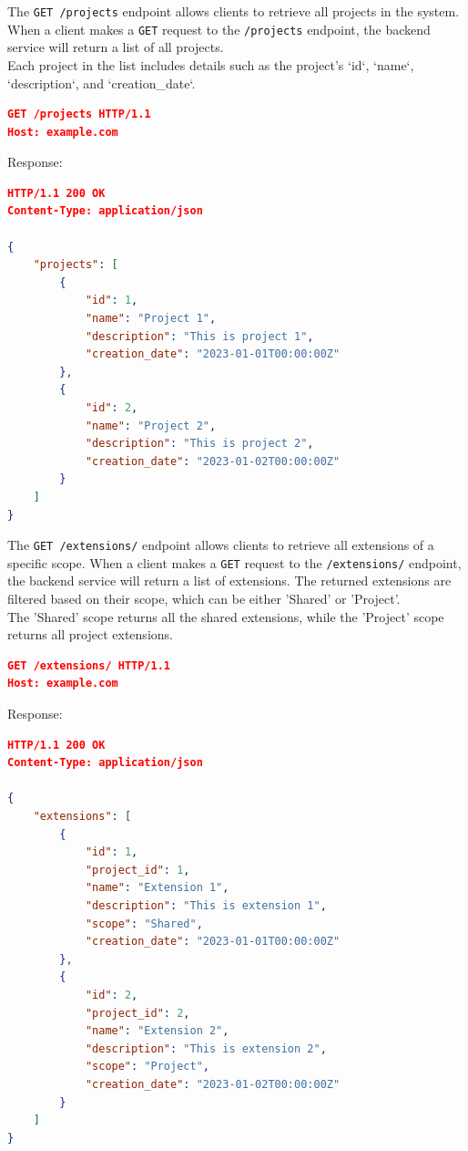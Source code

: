
The \texttt{GET /projects} endpoint allows clients to retrieve all projects in the system.
When a client makes a \texttt{GET} request to the \texttt{/projects} endpoint, the backend service will return a list of all projects.
\\Each project in the list includes details such as the project's `id`, `name`, `description`, and `creation\_date`.

\begin{lstlisting}[language=json,label={lst:lstlisting11}]
GET /projects HTTP/1.1
Host: example.com
\end{lstlisting}

Response:

\begin{lstlisting}[language=json,label={lst:lstlisting12}]
HTTP/1.1 200 OK
Content-Type: application/json

{
    "projects": [
        {
            "id": 1,
            "name": "Project 1",
            "description": "This is project 1",
            "creation_date": "2023-01-01T00:00:00Z"
        },
        {
            "id": 2,
            "name": "Project 2",
            "description": "This is project 2",
            "creation_date": "2023-01-02T00:00:00Z"
        }
    ]
}
\end{lstlisting}


The \texttt{GET /extensions/} endpoint allows clients to retrieve all extensions of a specific scope.
When a client makes a \texttt{GET} request to the \texttt{/extensions/} endpoint, the backend service will return a list of extensions.
The returned extensions are filtered based on their scope, which can be either 'Shared' or 'Project'.
\\The 'Shared' scope returns all the shared extensions, while the 'Project' scope returns all project extensions.
\\
\begin{lstlisting}[language=json,label={lst:lstlisting13}]
GET /extensions/ HTTP/1.1
Host: example.com
\end{lstlisting}

Response:

\begin{lstlisting}[language=json,label={lst:lstlisting14}]
HTTP/1.1 200 OK
Content-Type: application/json

{
    "extensions": [
        {
            "id": 1,
            "project_id": 1,
            "name": "Extension 1",
            "description": "This is extension 1",
            "scope": "Shared",
            "creation_date": "2023-01-01T00:00:00Z"
        },
        {
            "id": 2,
            "project_id": 2,
            "name": "Extension 2",
            "description": "This is extension 2",
            "scope": "Project",
            "creation_date": "2023-01-02T00:00:00Z"
        }
    ]
}
\end{lstlisting}

